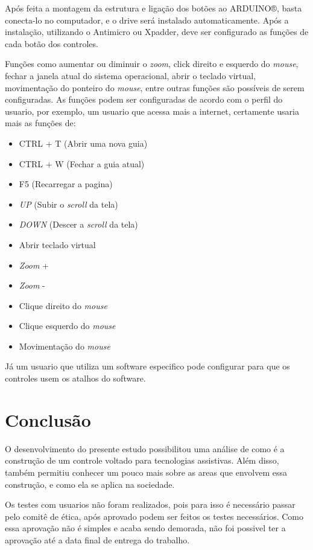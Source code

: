 \documentclass[
	12pt,			%
	openright,		%
	oneside,			%
	a4paper,			%
	chapter=TITLE,		%
	english,			%
	brazil,			%
	]{abntex2}
\begin{document}
Após feita a montagem da estrutura e ligação dos botões ao ARDUINO®, basta conecta-lo no computador, e o drive será instalado automaticamente. Após a instalação, utilizando o Antimicro ou Xpadder, deve ser configurado as funções de cada botão dos controles.

Funções como aumentar ou diminuir o \emph{zoom}, click direito e esquerdo do \emph{mouse}, fechar a janela atual do sistema operacional, abrir o teclado virtual, movimentação do ponteiro do \emph{mouse}, entre outras funções são possíveis de serem configuradas.
As funções podem ser configuradas de acordo com o perfil do usuario, por exemplo, um usuario que acessa mais a internet, certamente usaria mais as funções de:

\begin{itemize}
\item CTRL + T (Abrir uma nova guia)
\item CTRL + W (Fechar a guia atual)
\item F5 (Recarregar a pagina)
\item \emph{UP} (Subir o \emph{scroll} da tela)
\item \emph{DOWN} (Descer a \emph{scroll} da tela)
\item Abrir teclado virtual
\item \emph{Zoom} +
\item \emph{Zoom} -
\item Clique direito do \emph{mouse}
\item Clique esquerdo do \emph{mouse}
\item Movimentação do \emph{mouse}
\end{itemize}

Já um usuario que utiliza um software especifico pode configurar para que os controles usem os atalhos do software.

\chapter{Conclusão}

O desenvolvimento do presente estudo possibilitou uma análise de como é a construção de um controle voltado para tecnologias assistivas. Além disso, também permitiu conhecer um pouco mais sobre as areas que envolvem essa construção, e como ela se aplica na sociedade.

Os testes com usuarios não foram realizados, pois para isso é necessário passar pelo comitê de ética, após aprovado podem ser feitos os testes necessários. Como essa aprovação não é simples e acaba sendo demorada, não foi possivel ter a aprovação até a data final de entrega do trabalho.
\end{document}
